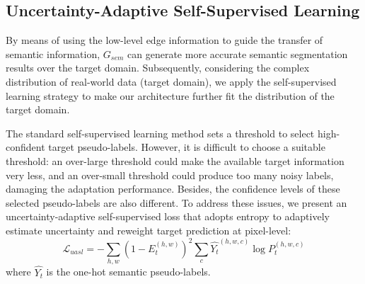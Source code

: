 \documentclass[sigconf]{acmart}
\begin{document}
\subsection{Uncertainty-Adaptive Self-Supervised Learning}
\par By means of using the low-level edge information to guide the transfer of semantic information, $G_{sem}$ can generate more accurate semantic segmentation results over the target domain. Subsequently, considering the complex distribution of real-world data (target domain), we apply the self-supervised learning strategy to make our architecture further fit the distribution of the target domain. 
\par The standard self-supervised learning method \cite{zou2018unsupervised,pan2020unsupervised} sets a threshold to select high-confident target pseudo-labels. However, it is difficult to choose a suitable threshold: an over-large threshold could make the available target information very less, and an over-small threshold could produce too many noisy labels, damaging the adaptation performance. Besides, the confidence levels of these selected pseudo-labels are also different. To address these issues, we present an uncertainty-adaptive self-supervised loss that adopts entropy to adaptively estimate uncertainty and reweight target prediction at pixel-level:
\begin{equation}
    \mathcal{L}_{uasl}=-\sum_{h, w}\left(1-E_{t}^{(h, w)}\right)^{2} \sum_{c} \hat{Y_{t}}^{(h, w, c)} \log P_{t}^{(h, w, c)}
\label{eq:5}
\end{equation}
where $\hat{Y_{t}}$ is the one-hot semantic pseudo-labels.
\end{document}
